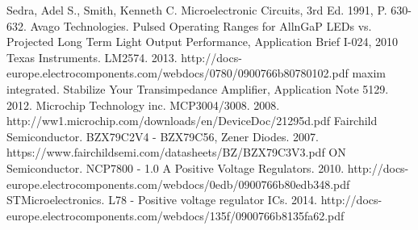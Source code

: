 \begin{thebibliography}{11}
		Sedra, Adel S., Smith, Kenneth C. Microelectronic Circuits, 3rd Ed. 1991, P. 630-632.
		Avago Technologies. Pulsed Operating Ranges for AllnGaP LEDs vs. Projected Long Term Light Output Performance, Application Brief I-024, 2010
		Texas Instruments. LM2574. 2013. http://docs-europe.electrocomponents.com/webdocs/0780/0900766b80780102.pdf
		maxim integrated. Stabilize Your Transimpedance Amplifier, Application Note 5129. 2012.
		Microchip Technology inc. MCP3004/3008. 2008. http://ww1.microchip.com/downloads/en/DeviceDoc/21295d.pdf
		Fairchild Semiconductor. BZX79C2V4 - BZX79C56, Zener Diodes. 2007. https://www.fairchildsemi.com/datasheets/BZ/BZX79C3V3.pdf
		ON Semiconductor. NCP7800 -	1.0 A Positive Voltage Regulators. 2010. http://docs-europe.electrocomponents.com/webdocs/0edb/0900766b80edb348.pdf
		STMicroelectronics. L78 - Positive voltage regulator ICs. 2014. http://docs-europe.electrocomponents.com/webdocs/135f/0900766b8135fa62.pdf
\end{thebibliography}